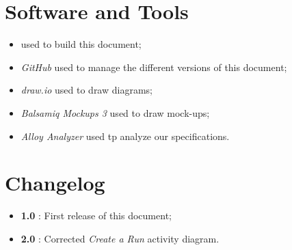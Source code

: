 \section{Software and Tools}
\begin{itemize}
  \item \text{\LaTeX} used to build this document;
  \item \textit{GitHub} used to manage the different versions of this document;
  \item \textit{draw.io} used to draw diagrams;
  \item \textit{Balsamiq Mockups 3} used to draw mock-ups;
  \item \textit{Alloy Analyzer} used tp analyze our specifications.
\end{itemize}


\section{Changelog}
\begin{itemize}
  \item \textbf{1.0} : First release of this document;
  \item \textbf{2.0} : Corrected \textit{Create a Run} activity diagram.
\end{itemize}
